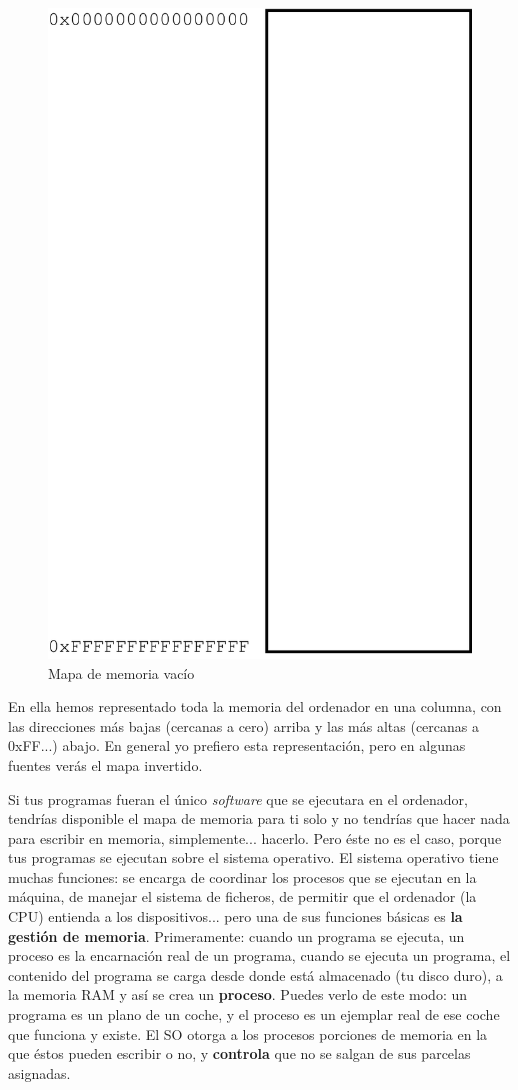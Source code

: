 \documentclass[a4paper]{article}
\begin{document}
\begin{figure}[H]
    \center
    \includegraphics[width=0.5\linewidth]{emptyMemoryMap}
    \caption{Mapa de memoria vacío}
    \label{img:emptyMemoryMap}
\end{figure}
En ella hemos representado toda la memoria del ordenador en una columna, con
las direcciones más bajas (cercanas a cero) arriba y las más altas (cercanas
a 0xFF...) abajo. En general yo prefiero esta representación, pero en algunas
fuentes verás el mapa invertido.

Si tus programas fueran el único \textit{software} que se ejecutara en el
ordenador, tendrías disponible el mapa de memoria para ti solo y no tendrías
que hacer nada para escribir en memoria, simplemente... hacerlo. Pero éste
no es el caso, porque tus programas se ejecutan sobre el sistema operativo.
El sistema operativo tiene muchas funciones: se encarga de coordinar los
procesos que se ejecutan en la máquina, de manejar el sistema de ficheros,
de permitir que el ordenador (la CPU) entienda a los dispositivos... pero
una de sus funciones básicas es \textbf{la gestión de memoria}.
Primeramente: cuando un programa se ejecuta, un
proceso es la encarnación real de un programa, cuando se ejecuta un programa,
el contenido del programa se carga desde donde está almacenado (tu disco duro),
a la memoria RAM y así se crea un \textbf{proceso}. Puedes verlo de este modo:
un programa es un plano de un coche, y el proceso es un ejemplar real de ese
coche que funciona y existe. El SO
otorga a los procesos porciones de memoria en la que éstos pueden escribir
o no, y \textbf{controla} que no se salgan de sus parcelas asignadas.
\end{document}
